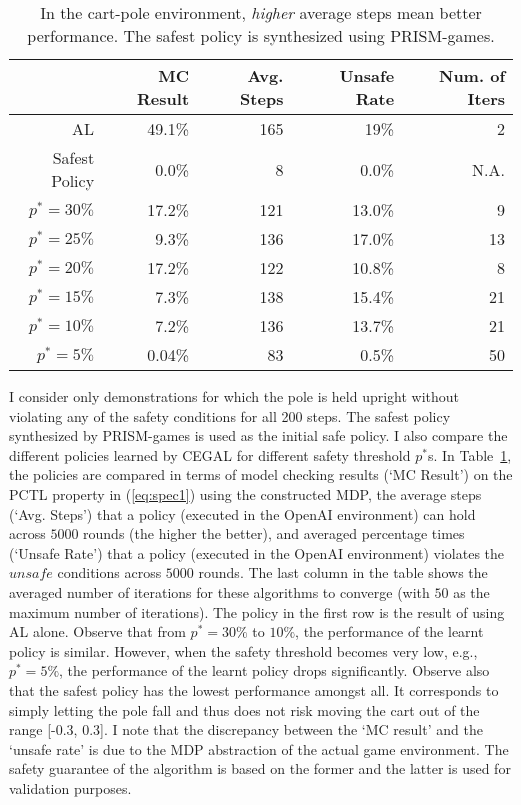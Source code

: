 {\begin{table}[htb]
\begin{center}
\caption{In the cart-pole environment, {\it higher} average steps mean better performance. The safest policy is synthesized using PRISM-games.}
\begin{tabular}{|r|r|r|r|r|}
\hline
  &\small{\ \ MC Result} &\small{\ \ Avg. Steps}  &\small{\ \ Unsafe Rate} &\small{\ \ Num. of Iters}\\
\hline
AL &49.1\%& 165 &  19\% & 2\\
\hline
Safest Policy  & 0.0\% & 8 & 0.0\% & N.A.\\
\hline
$p^*=30\%$ & 17.2\%  & 121 & 13.0\% & 9\\
\hline
$p^*=25\%$ & 9.3\%  & 136 & 17.0\% & 13\\
\hline
$p^*=20\%$ & 17.2\% & 122 & 10.8\% & 8\\
\hline
$p^*=15\%$ & 7.3\% & 138 & 15.4\% & 21\\
\hline
$p^*=10\%$ & 7.2\% & 136 & 13.7\% & 21\\
\hline
$p^*=5\%$ & 0.04\% & 83 & 0.5\% & 50\\
\hline
\end{tabular}
\label{tab:cartpole1}
\end{center}
\end{table}

 I consider only demonstrations for which the pole is held upright without violating any of the safety conditions for all 200 steps. The safest policy synthesized by PRISM-games is used as the initial safe policy. 
 I also compare the different policies learned by CEGAL for different safety threshold $p^*$s. 
In Table~\ref{tab:cartpole1}, the policies are compared in terms of model checking results (`MC Result') on the PCTL property in (\ref{eq:spec1}) using the constructed MDP, the average steps (`Avg. Steps') that a policy (executed in the OpenAI environment) can hold across $5000$ rounds (the higher the better), and averaged percentage times (`Unsafe Rate') that a policy (executed in the OpenAI environment) violates the $unsafe$ conditions across $5000$ rounds. The last column in the table shows the averaged number of iterations for these algorithms to converge (with $50$ as the maximum number of iterations). 
The policy in the first row is the result of using AL alone. 
Observe that from $p^* = 30\%$ to $10\%$, the performance of the learnt policy is similar. However, when the safety threshold becomes very low, e.g., $p^*=5\%$, the performance of the learnt policy drops significantly. 
Observe also that the safest policy has the lowest performance amongst all. 
It corresponds to simply letting the pole fall and thus does not risk moving the cart out of the range [-0.3, 0.3]. 
 I note that the discrepancy between the `MC result' and the `unsafe rate' is due to the MDP abstraction of the actual game environment. The safety guarantee of the algorithm is based on the former and the latter is used for validation purposes. 

}
